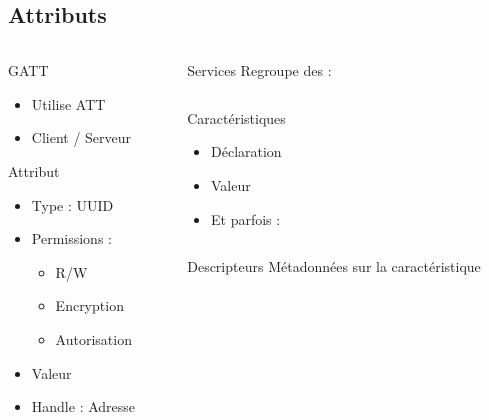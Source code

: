 \subsection{Attributs}
\begin{frame}
\begin{columns}[t]
\begin{column}{0.45\linewidth}
	\begin{block}{GATT}
		\begin{itemize}
			\item Utilise ATT
			\item Client / Serveur
		\end{itemize}
	\end{block}
	\begin{block}{Attribut}
		\begin{itemize}
			\item Type : UUID
			\item Permissions : \begin{itemize}
						\item R/W
						\item Encryption
						\item Autorisation
					\end{itemize}
			\item Valeur
			\item Handle : Adresse
		\end{itemize}
	\end{block}
\end{column}
\begin{column}[t]{0.45\linewidth}

	\begin{block}{Services}
		Regroupe des :
		\begin{columns}[T]
		\begin{column}{0.90\textwidth}
		\begin{block}{Caractéristiques}
			\begin{itemize}
				\item Déclaration
				\item Valeur
				\item Et parfois :
			\end{itemize}
			\begin{columns}[T]
			\begin{column}{0.90\textwidth}
			\begin{block}{Descripteurs}
			Métadonnées sur la caractéristique
			\end{block}
			\end{column}
			\end{columns}
		\end{block}
		\end{column}
		\end{columns}
	\end{block}

\end{column}
\end{columns}
\end{frame}

